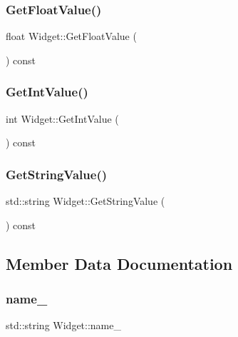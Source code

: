 \subsubsection{\texorpdfstring{Get\+Float\+Value()}{GetFloatValue()}}
{\footnotesize\ttfamily float Widget\+::\+Get\+Float\+Value (\begin{DoxyParamCaption}{ }\end{DoxyParamCaption}) const}

\mbox{\label{classWidget_a15e7d0423020a7a98063a749fb97bdd3}} 
\subsubsection{\texorpdfstring{Get\+Int\+Value()}{GetIntValue()}}
{\footnotesize\ttfamily int Widget\+::\+Get\+Int\+Value (\begin{DoxyParamCaption}{ }\end{DoxyParamCaption}) const}

\mbox{\label{classWidget_a7a6e3a7fca3a9373f631c94dc1494d22}} 
\subsubsection{\texorpdfstring{Get\+String\+Value()}{GetStringValue()}}
{\footnotesize\ttfamily std\+::string Widget\+::\+Get\+String\+Value (\begin{DoxyParamCaption}{ }\end{DoxyParamCaption}) const}



\subsection{Member Data Documentation}
\mbox{\label{classWidget_a1d2f74810f3f912270a681e0671a7a55}} 
\subsubsection{\texorpdfstring{name\+\_\+}{name\_}}
{\footnotesize\ttfamily std\+::string Widget\+::name\+\_\+\hspace{0.3cm}{\ttfamily [private]}}

